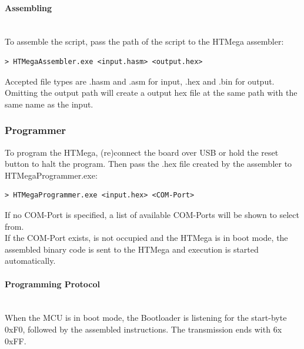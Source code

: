 \paragraph{Assembling} ~\\
To assemble the script, pass the path of the script to the HTMega assembler:
\begin{mdframed}[backgroundcolor=light-gray, roundcorner=10pt,leftmargin=1, rightmargin=1, innerleftmargin=15, innertopmargin=6,innerbottommargin=6, outerlinewidth=1, linecolor=light-gray]
\begin{lstlisting}[style=hasm]
> HTMegaAssembler.exe <input.hasm> <output.hex>
\end{lstlisting}
\end{mdframed}
Accepted file types are .hasm and .asm for input, .hex and .bin for output.
Omitting the output path will create a output hex file at the same path with the same name as the input.

\subsubsection{Programmer}
To program the HTMega, (re)connect the board over USB or hold the reset button to halt the program.
Then pass the .hex file created by the assembler to HTMegaProgrammer.exe:
\begin{mdframed}[backgroundcolor=light-gray, roundcorner=10pt,leftmargin=1, rightmargin=1, innerleftmargin=15, innertopmargin=6,innerbottommargin=6, outerlinewidth=1, linecolor=light-gray]
\begin{lstlisting}[style=hasm]
> HTMegaProgrammer.exe <input.hex> <COM-Port>
\end{lstlisting}
\end{mdframed}
If no COM-Port is specified, a list of available COM-Ports will be shown to select from.\\

If the COM-Port exists, is not occupied and the HTMega is in boot mode, the assembled binary code is sent to the HTMega and execution is started automatically.

\paragraph{Programming Protocol} ~\\
When the MCU is in boot mode, the Bootloader is listening for the start-byte 0xF0, 
followed by the assembled instructions. The transmission ends with 6x 0xFF.
\newpage


